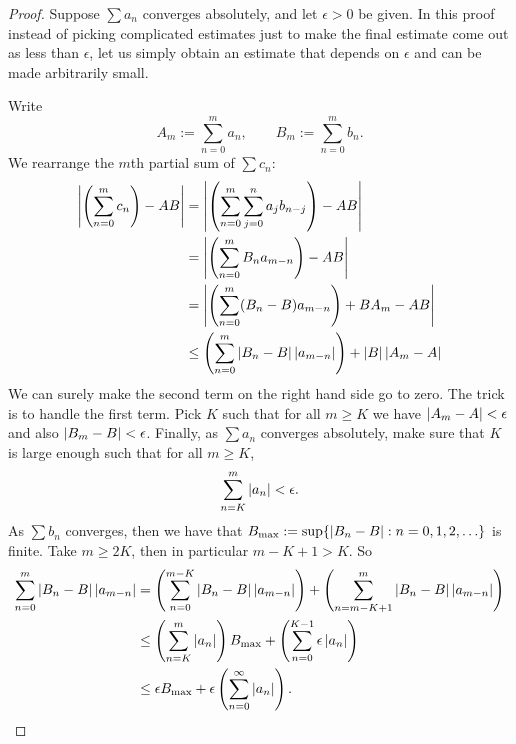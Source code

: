 \begin{proof}
Suppose $\sum a_n$ converges absolutely, and let $\epsilon > 0$ be
given.
In this proof instead of picking complicated estimates just to make
the final estimate come out as less than $\epsilon$,
let us simply obtain an estimate that depends on $\epsilon$
and can be made arbitrarily small.

Write
\begin{equation*}
A_m := \sum_{n=0}^m a_n , \qquad B_m := \sum_{n=0}^m b_n .
\end{equation*}
We rearrange the $m$th partial sum of $\sum c_n$:
\begin{equation*}
\begin{split}
\left\lvert {\left(\sum_{n=0}^m c_n \right) - AB} \right\rvert
& =
\left\lvert {\left( \sum_{n=0}^m \sum_{j=0}^n a_j b_{n-j} \right) - AB} \right\rvert
\\
& =
\left\lvert {\left( \sum_{n=0}^m
  B_n a_{m-n} \right) - AB} \right\rvert
\\
& =
\left\lvert {\left( \sum_{n=0}^m
  ( B_n -  B ) a_{m-n} \right)
    + B A_m - AB} \right\rvert
\\
& \leq
\left(
\sum_{n=0}^m
  \left\lvert { B_n -  B } \right\rvert \left\lvert {a_{m-n}} \right\rvert
\right)
+
\left\lvert {B} \right\rvert\left\lvert {A_m - A} \right\rvert
\end{split}
\end{equation*}
We can surely make the second term on the right hand side go to zero.
The trick is to handle the first term.
Pick $K$ such that for all $m \geq K$ we have 
$\left\lvert {A_m - A} \right\rvert < \epsilon$ and
also
$\left\lvert {B_m - B} \right\rvert < \epsilon$.  Finally,
as $\sum a_n$ converges absolutely,
make sure that $K$ is large enough such that
for all $m \geq K$,
\begin{equation*}
\sum_{n=K}^m \left\lvert {a_n} \right\rvert < \epsilon .
\end{equation*}
As $\sum b_n$ converges, then
we have that
$B_{\text{max}} := \sup \{ \left\lvert { B_n - B } \right\rvert : n = 0,1,2,\ldots \}$
is finite.  Take $m \geq 2K$, then in particular $m-K+1 > K$.  So
\begin{equation*}
\begin{split}
\sum_{n=0}^m
  \left\lvert { B_n -  B } \right\rvert \left\lvert {a_{m-n}} \right\rvert
& =
\left(
\sum_{n=0}^{m-K}
  \left\lvert { B_n -  B } \right\rvert \left\lvert {a_{m-n}} \right\rvert
\right)
+
\left(
\sum_{n=m-K+1}^m
  \left\lvert { B_n -  B } \right\rvert \left\lvert {a_{m-n}} \right\rvert
\right)
\\
& \leq
\left(
\sum_{n=K}^m
\left\lvert {a_{n}} \right\rvert
\right)
B_{\text{max}}
+
\left(
\sum_{n=0}^{K-1}
  \epsilon \left\lvert {a_{n}} \right\rvert
\right)
\\
& \leq
\epsilon
B_{\text{max}}
+
\epsilon
\left(
\sum_{n=0}^\infty \left\lvert {a_{n}} \right\rvert
\right) .
\end{split}
\end{equation*}

\end{proof}
